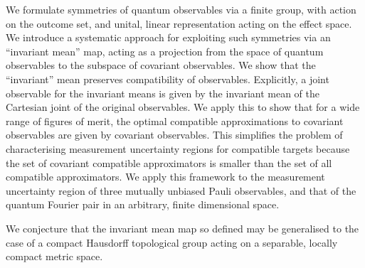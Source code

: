 We formulate symmetries of quantum observables via a finite group, with action on the outcome set, and unital, linear representation acting on the effect space. We introduce a systematic approach for exploiting such symmetries via an ``invariant mean'' map, acting as a projection from the space of quantum observables to the subspace of covariant observables. We show that the ``invariant'' mean preserves compatibility of observables. Explicitly, a joint observable for the invariant means is given by the invariant mean of the Cartesian joint of the original observables. We apply this to show that for a wide range of figures of merit, the optimal compatible approximations to covariant observables are given by covariant observables. This simplifies the problem of characterising measurement uncertainty regions for compatible targets because the set of covariant compatible approximators is smaller than the set of all compatible approximators. We apply this framework to the measurement uncertainty region of three mutually unbiased Pauli observables, and that of the quantum Fourier pair in an arbitrary, finite dimensional space.

We conjecture that the invariant mean map so defined may be generalised to the case of a compact Hausdorff topological group acting on a separable, locally compact metric space.
